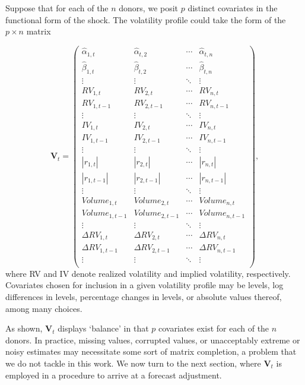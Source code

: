 \documentclass[11pt,3p,review,authoryear]{elsarticle}
\theoremstyle{definition}
\begin{document}
    Suppose that for each of the $n$ donors, we posit $p$ distinct covariates in the functional form of the shock.  The volatility profile could take the form of the $p \times n$ matrix 

    \begin{equation*}
      \textbf{V}_{t} = 
      \begin{pmatrix}
      \hat\alpha_{1,t} & \hat\alpha_{t,2}  & \cdots & \hat\alpha_{t,n}  \\
      \hat\beta_{1,t} & \hat\beta_{t,2}  & \cdots & \hat\beta_{t,n}  \\
      \vdots  & \vdots  & \ddots & \vdots  \\
      RV_{1,t} & RV_{2,t}  & \cdots & RV_{n,t}  \\
      RV_{1,t-1}  & RV_{2,t-1}  & \cdots & RV_{n,t-1}  \\
      \vdots  & \vdots  & \ddots & \vdots  \\
      IV_{1,t} & IV_{2,t} & \cdots & IV_{n,t} \\
      IV_{1,t-1}  & IV_{2,t-1}  & \cdots & IV_{n,t-1} \\
      \vdots  & \vdots  & \ddots & \vdots  \\
      |r_{1,t}| & |r_{2,t}| & \cdots & |r_{n,t}| \\
      |r_{1,t-1}|  & |r_{2,t-1}|  & \cdots & |r_{n,t-1}| \\
      \vdots  & \vdots  & \ddots & \vdots  \\
      Volume_{1,t}  & Volume_{2,t}  & \cdots & Volume_{n,t} \\
      Volume_{1,t-1}  & Volume_{2,t-1}  & \cdots & Volume_{n,t-1}  \\
      \vdots  & \vdots  & \ddots & \vdots  \\
      \Delta RV_{1,t} & \Delta RV_{2,t}  & \cdots & \Delta RV_{n,t}  \\
      \Delta RV_{1,t-1}  & \Delta RV_{2,t-1}  & \cdots & \Delta RV_{n,t-1}  \\
      \vdots  & \vdots  & \ddots & \vdots  \\
      \end{pmatrix},
      \end{equation*}
      where RV and IV denote realized volatility and implied volatility, respectively.  Covariates chosen for inclusion in a given volatility profile may be levels, log differences in levels, percentage changes in levels, or absolute values thereof, among many choices.

      As shown, $\textbf{V}_{t}$ displays `balance' in that $p$ covariates exist for each of the $n$ donors.  In practice, missing values, corrupted values, or unacceptably extreme or noisy estimates may necessitate some sort of matrix completion, a problem that we do not tackle in this work.  We now turn to the next section, where $\textbf{V}_{t}$ is employed in a procedure to arrive at a forecast adjustment. 
    
\end{document}
